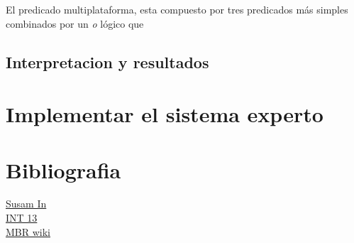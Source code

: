\documentclass[11pt,oneside,a4paper]{article}
\begin{document}

El predicado multiplataforma, esta compuesto por tres predicados más simples
combinados por un \emph {o} lógico que 

\subsection{Interpretacion y resultados}

\section{Implementar el sistema experto}


\section*{Bibliografia}


\href{http://susam.in/articles/boot-sector-code/}{Susam In}\\
\href{http://www.pelletiernet.com/helppc/int_13-2.html}{INT 13}\\
\href{http://en.wikipedia.org/wiki/Master_boot_record}{MBR wiki}
\end{document}
